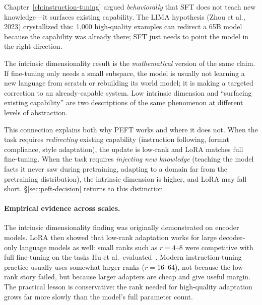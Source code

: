 \begin{tcolorbox}[colback=gray!5, colframe=gray!50, title=\textbf{The LIMA--Aghajanyan Connection}]
Chapter~\ref{ch:instruction-tuning} argued \emph{behaviorally} that SFT does not teach new knowledge---it surfaces existing capability. The LIMA hypothesis (Zhou et al., 2023) crystallized this: 1{,}000 high-quality examples can redirect a 65B model because the capability was already there; SFT just needs to point the model in the right direction.

\medskip
The intrinsic dimensionality result is the \emph{mathematical} version of the same claim. If fine-tuning only needs a small subspace, the model is usually not learning a new language from scratch or rebuilding its world model; it is making a targeted correction to an already-capable system. Low intrinsic dimension and ``surfacing existing capability'' are two descriptions of the same phenomenon at different levels of abstraction.

\medskip
This connection explains both why PEFT works and where it does not. When the task requires \emph{redirecting} existing capability (instruction following, format compliance, style adaptation), the update is low-rank and LoRA matches full fine-tuning. When the task requires \emph{injecting new knowledge} (teaching the model facts it never saw during pretraining, adapting to a domain far from the pretraining distribution), the intrinsic dimension is higher, and LoRA may fall short. \S\ref{sec:peft-decision} returns to this distinction.
\end{tcolorbox}

\paragraph{Empirical evidence across scales.} The intrinsic dimensionality finding was originally demonstrated on encoder models. LoRA then showed that low-rank adaptation works for large decoder-only language models as well: small ranks such as $r=4$--$8$ were competitive with full fine-tuning on the tasks Hu et al.\ evaluated~\cite{hu2021lora}. Modern instruction-tuning practice usually uses somewhat larger ranks ($r=16$--$64$), not because the low-rank story failed, but because larger adapters are cheap and give useful margin. The practical lesson is conservative: the rank needed for high-quality adaptation grows far more slowly than the model's full parameter count.

\noindent{}

